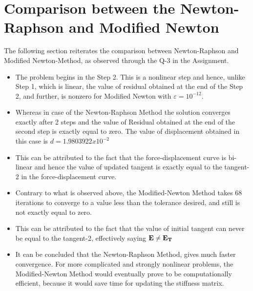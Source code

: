 \documentclass[11pt]{article}
\begin{document}
\section{Comparison between the Newton-Raphson and Modified Newton}
The following section reiterates the comparison between Newton-Raphson and Modified Newton-Method, as observed through the Q-3 in the Assignment. 
\begin{itemize}
\item The problem begins in the Step 2. This is a nonlinear step and hence, unlike Step 1, which is linear, the value of residual obtained at the end of the Step 2, and further, is nonzero for Modified Newton with $\varepsilon=10^{-12}$. 
\item Whereas in case of the Newton-Raphson Method the solution converges exactly after 2 steps and the value of Residual obtained at the end of the second step is exactly equal to zero. The value of displacement obtained in this case is $d=1.9803922x10^{-2}$
\item This can be attributed to the fact that the force-displacement curve is bi-linear and hence the value of updated tangent is exactly equal to the tangent-2 in the force-displacement curve. 
\item Contrary to what is observed above, the Modified-Newton Method takes 68 iterations to converge to a value less than the tolerance desired, and still is not exactly equal to zero. 
\item This can be attributed to the fact that the value of initial tangent can never be equal to the tangent-2, effectively saying $\bf E \neq E_T$
\item It can be concluded that the Newton-Raphson Method, gives much faster convergence. For more complicated and strongly nonlinear problems, the Modified-Newton Method would eventually prove to be computationally efficient, because it would save time for updating the stiffness matrix.
\end{itemize} 
\end{document}
